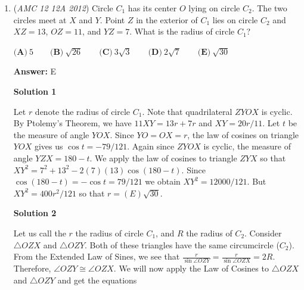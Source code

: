 \begin{enumerate}
 B - B - B - W - B

 B - B - B - B - B

 W - B - W - B - W

 W - B - B - B - B

 As one can astutely notice, no "W" entries are sitting right next to each other! All of these orbits would actually work. Thus, we have a total of $7$ corner orbits. As we said before, because of the symmetry of a square, the edge orbits would function absolutely the same way as the corner orbits and thus we would also have $7$ edge orbits. To end with a full on black grid, we must combine a corner orbit with an edge orbit for a total of $7 \cdot 7 = 49$ cases. Thus the probability is $\frac{49}{512}$ which results to $\boxed{A}$. 

 Note: The $5$ square in the middle just stays the same even after the rotation so that is why it isn't included in any of the orbits. 

 


	\item (\textit{AMC 12 12A 2012}) Circle $C_1$ has its center $O$ lying on circle $C_2$.  The two circles meet at $X$ and $Y$.  Point $Z$ in the exterior of $C_1$ lies on circle $C_2$ and $XZ=13$, $OZ=11$, and $YZ=7$.  What is the radius of circle $C_1$?


 $\textbf{(A)}\ 5\qquad\textbf{(B)}\ \sqrt{26}\qquad\textbf{(C)}\ 3\sqrt{3}\qquad\textbf{(D)}\ 2\sqrt{7}\qquad\textbf{(E)}\ \sqrt{30}$

 \textbf{Answer: }E



\textbf{Solution 1}

Let $r$ denote the radius of circle $C_1$. Note that quadrilateral $ZYOX$ is cyclic. By Ptolemy's Theorem, we have $11XY=13r+7r$ and $XY=20r/11$. Let $t$ be the measure of angle $YOX$. Since $YO=OX=r$, the law of cosines on triangle $YOX$ gives us $\cos t =-79/121$. Again since $ZYOX$ is cyclic, the measure of angle $YZX=180-t$. We apply the law of cosines to triangle $ZYX$ so that $XY^2=7^2+13^2-2(7)(13)\cos(180-t)$. Since $\cos(180-t)=-\cos t=79/121$ we obtain $XY^2=12000/121$. But $XY^2=400r^2/121$ so that $r=\boxed{(E)\sqrt{30}}$.

 



\textbf{Solution 2}

Let us call the $r$ the radius of circle $C_1$, and $R$ the radius of $C_2$. Consider $\triangle OZX$ and $\triangle OZY$. Both of these triangles have the same circumcircle ($C_2$). From the Extended Law of Sines, we see that $\frac{r}{\sin{\angle{OZY}}} = \frac{r}{\sin{\angle{OZX}}}= 2R$. Therefore, $\angle{OZY} \cong \angle{OZX}$. We will now apply the Law of Cosines to $\triangle OZX$ and $\triangle OZY$ and get the equations 


\end{enumerate}
